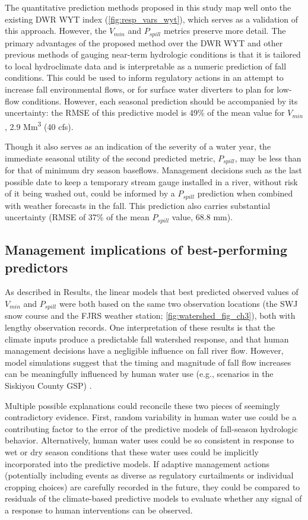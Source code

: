\documentclass[hess, manuscript]{copernicus}
\begin{document}
The quantitative prediction methods proposed in this study map well onto
the existing DWR WYT index (\autoref{fig:resp_vars_wyt}), which serves
as a validation of this approach. However, the \(V_{min}\) and
\(P_{spill}\) metrics preserve more detail. The primary advantages of
the proposed method over the DWR WYT and other previous methods of
gauging near-term hydrologic conditions is that it is tailored to local
hydroclimate data and is interpretable as a numeric prediction of fall
conditions. This could be used to inform regulatory actions in an
attempt to increase fall environmental flows, or for surface water
diverters to plan for low-flow conditions. However, each seasonal
prediction should be accompanied by its uncertainty: the RMSE of this
predictive model is 49\% of the mean value for \(V_{min}\), 2.9
Mm\textsuperscript{3} (40 cfs).

Though it also serves as an indication of the severity of a water year,
the immediate seasonal utility of the second predicted metric,
\(P_{spill}\), may be less than for that of minimum dry season
baseflows. Management decisions such as the last possible date to keep a
temporary stream gauge installed in a river, without risk of it being
washed out, could be informed by a \(P_{spill}\) prediction when
combined with weather forecasts in the fall. This prediction also
carries substantial uncertainty (RMSE of 37\% of the mean \(P_{spill}\)
value, 68.8 mm).

\subsection{Management implications of best-performing predictors}

As described in Results, the linear models that best predicted observed
values of \(V_{min}\) and \(P_{spill}\) were both based on the same two
observation locations (the SWJ snow course and the FJRS weather station;
\autoref{fig:watershed_fig_ch3}), both with lengthy observation records.
One interpretation of these results is that the climate inputs produce a
predictable fall watershed response, and that human management decisions
have a negligible influence on fall river flow. However, model
simulations suggest that the timing and magnitude of fall flow increases
can be meaningfully influenced by human water use (e.g., scenarios in
the Siskiyou County GSP) \citeyearpar[Siskiyou
County][]{SiskiyouCounty2021}.

Multiple possible explanations could reconcile these two pieces of
seemingly contradictory evidence. First, random variability in human
water use could be a contributing factor to the error of the predictive
models of fall-season hydrologic behavior. Alternatively, human water
uses could be so consistent in response to wet or dry season conditions
that these water uses could be implicitly incorporated into the
predictive models. If adaptive management actions (potentially including
events as diverse as regulatory curtailments or individual cropping
choices) are carefully recorded in the future, they could be compared to
residuals of the climate-based predictive models to evaluate whether any
signal of a response to human interventions can be observed.
\end{document}
